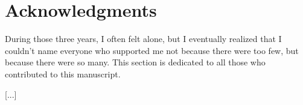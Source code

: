\chapter*{Acknowledgments}
%




During those three years, I often felt alone, but I eventually realized that I couldn't name everyone who supported me not because there were too few, but because there were so many.
This section is dedicated to all those who contributed to this manuscript.

[...]